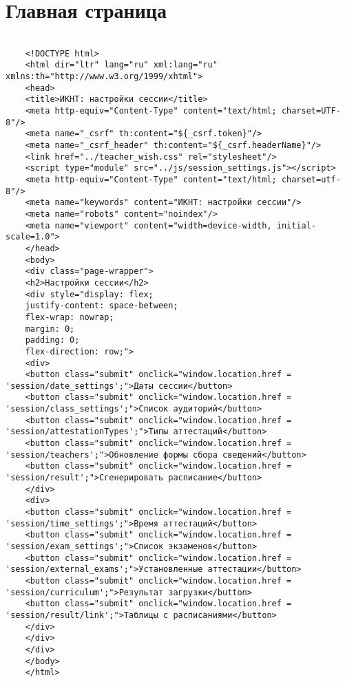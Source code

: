 \chapter{Главная страница}\label{appendix-mainpage}	

\begin{lstlisting}
	
	<!DOCTYPE html>
	<html dir="ltr" lang="ru" xml:lang="ru" xmlns:th="http://www.w3.org/1999/xhtml">
	<head>
	<title>ИКНТ: настройки сессии</title>
	<meta http-equiv="Content-Type" content="text/html; charset=UTF-8"/>
	<meta name="_csrf" th:content="${_csrf.token}"/>
	<meta name="_csrf_header" th:content="${_csrf.headerName}"/>
	<link href="../teacher_wish.css" rel="stylesheet"/>
	<script type="module" src="../js/session_settings.js"></script>
	<meta http-equiv="Content-Type" content="text/html; charset=utf-8"/>
	<meta name="keywords" content="ИКНТ: настройки сессии"/>
	<meta name="robots" content="noindex"/>
	<meta name="viewport" content="width=device-width, initial-scale=1.0">
	</head>
	<body>
	<div class="page-wrapper">
	<h2>Настройки сессии</h2>
	<div style="display: flex;
	justify-content: space-between;
	flex-wrap: nowrap;
	margin: 0;
	padding: 0;
	flex-direction: row;">
	<div>
	<button class="submit" onclick="window.location.href = 'session/date_settings';">Даты сессии</button>
	<button class="submit" onclick="window.location.href = 'session/class_settings';">Список аудиторий</button>
	<button class="submit" onclick="window.location.href = 'session/attestationTypes';">Типы аттестаций</button>
	<button class="submit" onclick="window.location.href = 'session/teachers';">Обновление формы сбора сведений</button>
	<button class="submit" onclick="window.location.href = 'session/result';">Сгенерировать расписание</button>
	</div>
	<div>
	<button class="submit" onclick="window.location.href = 'session/time_settings';">Время аттестаций</button>
	<button class="submit" onclick="window.location.href = 'session/exam_settings';">Список экзаменов</button>
	<button class="submit" onclick="window.location.href = 'session/external_exams';">Установленные аттестации</button>
	<button class="submit" onclick="window.location.href = 'session/curriculum';">Результат загрузки</button>
	<button class="submit" onclick="window.location.href = 'session/result/link';">Таблицы с расписаниями</button>
	</div>
	</div>
	</div>
	</body>
	</html>
	
\end{lstlisting}